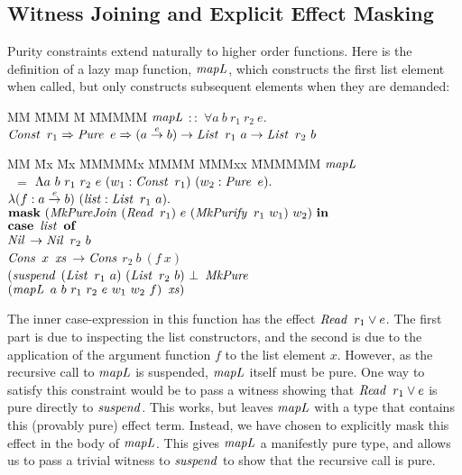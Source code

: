 \subsection{Witness Joining and Explicit Effect Masking}
Purity constraints extend naturally to higher order functions. Here is the definition of a lazy map function, $\operatorname{\mathit{mapL}}$, which constructs the first list element when called, but only constructs subsequent elements when they are demanded:
\begin{tabbing}
MM \= MMM \= M \= MMMMM \kill
	\> $\operatorname{\mathit{mapL}}$	\> $::$ \> $\forall a \ b \ r_1 \ r_2 \ e.$ \\
	\>		\> 	\> $\operatorname{\mathit{Const}} \ r_1 \Rightarrow \operatorname{\mathit{Pure}} \ e \Rightarrow (a \stackrel{e}{\rightarrow} b) \to \operatorname{\mathit{List}} \ r_1 \ a  \to \operatorname{\mathit{List}} \ r_2 \ b$ 
\end{tabbing}
\begin{tabbing}
MM \= Mx \= Mx \= MMMMMx \= MMMM \= MMMxx \= MMMMMM \kill
	\> $\operatorname{\mathit{mapL}}$ \\
	\> \ $=$	\> $\Lambda a \ b \ r_1 \ r_2 \ e \ (w_1 : \operatorname{\mathit{Const}} \ r_1) \ (w_2 : \operatorname{\mathit{Pure}} \ e).$ \\
	\>		\> $\lambda (f : a \stackrel{e}{\rightarrow} b) \ (\operatorname{\mathit{list}} : \operatorname{\mathit{List}} \ r_1 \ a).$ \\
	\>		\> $\kmask \ (\iMkPureJoin \ (\iRead \ r_1) \ e \ (\iMkPurify \ r_1 \ w_1) \ w_2) \ \kin$ \\
	\> 		\> $\textrm{\textbf{case}} \ \operatorname{\mathit{list}} \ \textrm{\textbf{of}}$ \\
	\> 		\> \> $\operatorname{\mathit{Nil}}$			\> $\to \operatorname{\mathit{Nil}} \ r_2 \ b$ \\
	\> 		\> \> $\operatorname{\mathit{Cons}} \ x \ \operatorname{\mathit{xs}}$	
				\> $\to \operatorname{\mathit{Cons}}$ 
					\> $r_2 \ b \ (f \ x)$ \\
	\>		\> \>   \>	\> $(\operatorname{\mathit{suspend}}$ \> $(\iList \ r_1 \ a) \ (\iList \ r_2 \ b) \ \bot \ \iMkPure$ \\
	\>		\> \>	\>	\>		\> $(\imapL \ a \ b \ r_1 \ r_2 \ e \ w_1 \ w_2 \ f) \ \ixs)$ 
\end{tabbing}
The inner case-expression in this function has the effect $\operatorname{\mathit{Read}} \ r_1 \lor e$. The first part is due to inspecting the list constructors, and the second is due to the application of the argument function $f$ to the list element $x$. However, as the recursive call to $\operatorname{\mathit{mapL}}$ is suspended, $\operatorname{\mathit{mapL}}$ itself must be pure. One way to satisfy this constraint would be to pass a witness showing that $\operatorname{\mathit{Read}} \ r_1 \lor e$ is pure directly to $\operatorname{\mathit{suspend}}$. This works, but leaves $\operatorname{\mathit{mapL}}$ with a type that contains this (provably pure) effect term. Instead, we have chosen to explicitly mask this effect in the body of $\operatorname{\mathit{mapL}}$. This gives $\operatorname{\mathit{mapL}}$ a manifestly pure type, and allows us to pass a trivial witness to $\operatorname{\mathit{suspend}}$ to show that the recursive call is pure.

